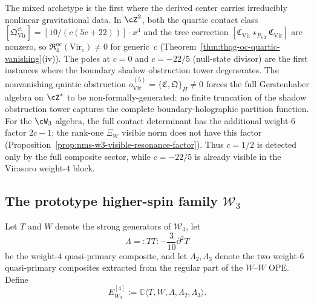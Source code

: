 \begin{remark}
\label{rem:nms-virasoro-derived-center}
The mixed archetype is the first where the derived center carries
irreducibly nonlinear gravitational data. In $\cZ^2$, both the
quartic contact class
$[\mathfrak{Q}^{\mathrm{ct}}_{\mathrm{Vir}}]
= [10/(c(5c+22))] \cdot x^4$
and the tree correction
$[\mathfrak{C}_{\mathrm{Vir}} \star_{P_{\mathrm{Vir}}}
\mathfrak{C}_{\mathrm{Vir}}]$ are nonzero, so
$\mathfrak{R}^{\mathrm{oc}}_4(\mathrm{Vir}_c) \neq 0$ for
generic~$c$
(Theorem~\ref{thm:thqg-oc-quartic-vanishing}(iv)).
The poles at $c = 0$ and $c = -22/5$ (null-state divisor) are the
first instances where the boundary shadow obstruction tower degenerates.
The nonvanishing quintic obstruction
$o^{(5)}_{\mathrm{Vir}} = \{\mathfrak{C}, \mathfrak{Q}\}_H \neq 0$
forces the full Gerstenhaber algebra on $\cZ^*$ to be
non-formally-generated: no finite truncation of the shadow obstruction tower
captures the complete boundary-holographic partition function.
For the $\cW_3$ algebra,
the full contact determinant has the additional weight-$6$ factor
$2c-1$; the rank-one $\Xi_W$ visible norm does not have this factor
(Proposition~\ref{prop:nms-w3-visible-resonance-factor}). Thus
$c=1/2$ is detected only by the full composite sector, while
$c=-22/5$ is already visible in the Virasoro weight-$4$ block.
\end{remark}

\subsection{The prototype higher-spin family \texorpdfstring{$\mathcal W_3$}{W3}}
\label{subsec:nms-w3}

\begin{definition}
\label{def:nms-w3-envelope}
Let $T$ and $W$ denote the strong generators of $\mathcal W_3$, let
\[
\Lambda=:TT:-\frac{3}{10}\partial^2T
\]
be the weight-$4$ quasi-primary composite, and let $\Lambda_2,\Lambda_3$ denote the two weight-$6$ quasi-primary composites extracted from the regular part of the $W$--$W$ OPE. Define
\[
E^{[4]}_{W_3}:=\mathbb C\langle T,W,\Lambda,\Lambda_2,\Lambda_3\rangle.
\]
\end{definition}

